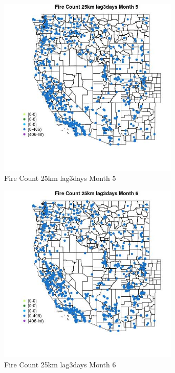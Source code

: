 \begin{figure} 
\centering  
\includegraphics[width=0.77\textwidth]{Code_Outputs/Report_ML_input_PM25_Step4_part_f_de_duplicated_aves_prioritize_24hr_obswNAs_MapObsMo5Fire_Count_25km_lag3days.jpg} 
\caption{\label{fig:Report_ML_input_PM25_Step4_part_f_de_duplicated_aves_prioritize_24hr_obswNAsMapObsMo5Fire_Count_25km_lag3days}Fire Count 25km lag3days Month 5} 
\end{figure} 
 

\begin{figure} 
\centering  
\includegraphics[width=0.77\textwidth]{Code_Outputs/Report_ML_input_PM25_Step4_part_f_de_duplicated_aves_prioritize_24hr_obswNAs_MapObsMo6Fire_Count_25km_lag3days.jpg} 
\caption{\label{fig:Report_ML_input_PM25_Step4_part_f_de_duplicated_aves_prioritize_24hr_obswNAsMapObsMo6Fire_Count_25km_lag3days}Fire Count 25km lag3days Month 6} 
\end{figure} 
 

